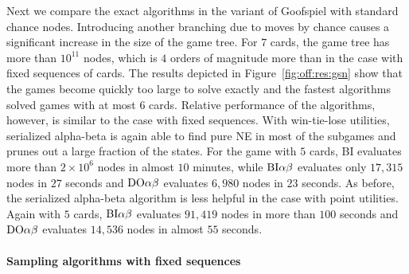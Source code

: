 {Next we compare the exact algorithms in the variant of Goofspiel with standard chance nodes.
Introducing another branching due to moves by chance causes a significant increase in the size of the game tree.
For $7$ cards, the game tree has more than $10^{11}$ nodes, which is $4$ orders of magnitude more than in the case with fixed sequences of cards.
The results depicted in Figure~\ref{fig:off:res:gsn} show that the games become quickly too large to solve exactly and the fastest algorithms solved games with at most $6$ cards.
Relative performance of the algorithms, however, is similar to the case with fixed sequences.
With win-tie-lose utilities, serialized alpha-beta is again able to find pure NE in most of the subgames and prunes out a large fraction of the states.
For the game with $5$ cards, BI evaluates more than $2 \times 10^6$ nodes in almost $10$ minutes, while $\textrm{BI}\alpha\beta$ evaluates only $17,315$ nodes in $27$ seconds and $\textrm{DO}\alpha\beta$ evaluates $6,980$ nodes in $23$ seconds.
As before, the serialized alpha-beta algorithm is less helpful in the case with point utilities.
Again with $5$ cards, $\textrm{BI}\alpha\beta$ evaluates $91,419$ nodes in more than $100$ seconds and $\textrm{DO}\alpha\beta$ evaluates $14,536$ nodes in almost $55$ seconds.
}

\paragraph{Sampling algorithms with fixed sequences}

